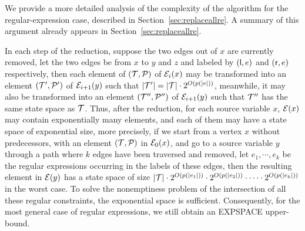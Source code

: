 We provide a more detailed analysis of the complexity of the algorithm for the regular-expression case, described in Section~\ref{sec:replaceallre}.
A summary of this argument already appears in Section~\ref{sec:replaceallre}.

In each step of the reduction, suppose the two edges out of $x$ are currently removed, let the two edges be from $x$ to $y$ and $z$ and labeled by $({\sf l}, e)$ and $({\sf r}, e)$ respectively, then each element of $(\mathcal{T}, \mathcal{P})$ of $\mathcal{E}_i(x)$ may be transformed into an element $(\mathcal{T}',\mathcal{P}')$ of $\mathcal{E}_{i+1}(y)$ such that $|\mathcal{T}'| = |\mathcal{T}| \cdot 2^{O(p(|e|))}$, meanwhile, it may also be transformed into an element $(\mathcal{T}'',\mathcal{P}'')$ of $\mathcal{E}_{i+1}(y)$ such that $\mathcal{T}''$ has the same state space as $\mathcal{T}$. Thus, after the reduction, for each source variable $x$, $\mathcal{E}(x)$ may contain exponentially many elements, and each of them may have a state space of exponential size, more precisely, if we start from a vertex $x$ without predecessors, with an element $(\mathcal{T},\mathcal{P})$ in $\mathcal{E}_0(x)$, and go to a source variable $y$ through a path where $k$ edges have been traversed and removed, let $e_1,\cdots, e_k$ be the regular expressions occurring in the labels of these edges, then the resulting element in $\mathcal{E}(y)$ has a state space of size $|\mathcal{T}| \cdot 2^{O(p(|e_1|))} \cdot 2^{O(p(|e_2|))} \cdot \cdots \cdot 2^{O(p(|e_k|))}$ in the worst case. To solve the nonemptiness problem of the intersection of all these regular constraints, the exponential space is sufficient. Consequently, for the most general case of regular expressions, we still obtain an EXPSPACE upper-bound. 


